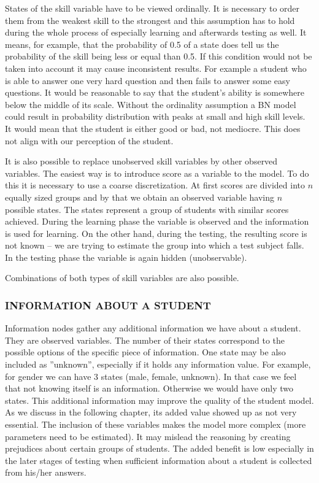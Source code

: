 States of the skill variable have to be viewed ordinally. It is necessary to order them from the weakest skill to the strongest and this assumption has to hold during the whole process of especially learning and afterwards testing as well. It means, for example, that the probability of 0.5 of a state does tell us the probability of the skill being less or equal than 0.5. If this condition would not be taken into account it may cause inconsistent results. For example a student who is able to answer one very hard question and then fails to answer some easy questions. It would be reasonable to say that the student's ability is somewhere below the middle of its scale. Without the ordinality assumption a BN model could result in probability distribution with peaks at small and high skill levels. It would mean that the student is either good or bad, not mediocre. This does not align with our perception of the student.

\label{observed_score}
It is also possible to replace unobserved skill variables by other observed variables. The easiest way is to introduce score as a variable to the model. To do this it is necessary to use a coarse discretization. At first scores are divided into $n$ equally sized groups and by that we obtain an observed variable having $n$ possible states. The states represent a group of students with similar scores achieved. During the learning phase the variable is observed and the information is used for learning. On the other hand, during the testing, the resulting score is not known -- we are trying to estimate the group into which a test subject falls. In the testing phase the variable is again hidden (unobservable).

Combinations of both types of skill variables are also possible.

\subsubsection{INFORMATION ABOUT A STUDENT}
Information nodes gather any additional information we have about a student. They are observed variables. The number of their states correspond to the possible options of the specific piece of information. One state may be also included as ''unknown'', especially if it holds any information value. For example, for gender we can have 3 states (male, female, unknown). In that case we feel that not knowing itself is an information. Otherwise we would have only two states.
This additional information may improve the quality of the student model. As we discuss in the following chapter, its added value showed up as not very essential. The inclusion of these variables makes the model more complex (more parameters need to be estimated). It may mislead the reasoning by creating prejudices about certain groups of students. The added benefit is low especially in the later stages of testing when sufficient information about a student is collected from his/her answers. 


